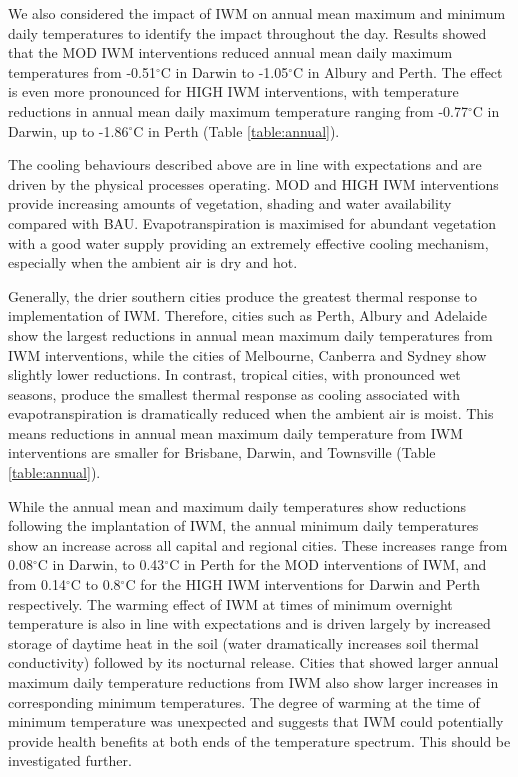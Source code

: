 \documentclass[utf8]{frontiersSCNS} %
\begin{document}
We also considered the impact of IWM on annual mean maximum and minimum daily temperatures to identify the impact throughout the day. Results showed that the MOD IWM interventions reduced annual mean daily maximum temperatures from -0.51$^{\circ}$C in Darwin to -1.05$^{\circ}$C in Albury and Perth. The effect is even more pronounced for HIGH IWM interventions, with temperature reductions in annual mean daily maximum temperature ranging from -0.77$^{\circ}$C in Darwin, up to -1.86$^{\circ}$C in Perth (Table \ref{table:annual}).

The cooling behaviours described above are in line with expectations and are driven by the physical processes operating. MOD and HIGH IWM interventions provide increasing amounts of vegetation, shading and water availability compared with BAU. Evapotranspiration is maximised for abundant vegetation with a good water supply providing an extremely effective cooling mechanism, especially when the ambient air is dry and hot. 

Generally, the drier southern cities produce the greatest thermal response to implementation of IWM. Therefore, cities such as Perth, Albury and Adelaide show the largest reductions in annual mean maximum daily temperatures from IWM interventions, while the cities of Melbourne, Canberra and Sydney show slightly lower reductions. In contrast, tropical cities, with pronounced wet seasons, produce the smallest thermal response as cooling associated with evapotranspiration is dramatically reduced when the ambient air is moist. This means reductions in annual mean maximum daily temperature from IWM interventions are smaller for Brisbane, Darwin, and Townsville (Table \ref{table:annual}). 

While the annual mean and maximum daily temperatures show reductions following the implantation of IWM, the annual minimum daily temperatures show an increase across all capital and regional cities. These increases range from 0.08$^{\circ}$C in Darwin, to 0.43$^{\circ}$C in Perth for the MOD interventions of IWM, and from 0.14$^{\circ}$C to 0.8$^{\circ}$C for the HIGH IWM interventions for Darwin and Perth respectively. The warming effect of IWM at times of minimum overnight temperature is also in line with expectations and is driven largely by increased storage of daytime heat in the soil (water dramatically increases soil thermal conductivity) followed by its nocturnal release. Cities that showed larger annual maximum daily temperature reductions from IWM also show larger increases in corresponding minimum temperatures. The degree of warming at the time of minimum temperature was unexpected and suggests that IWM could potentially provide health benefits at both ends of the temperature spectrum. This should be investigated further.
\end{document}
